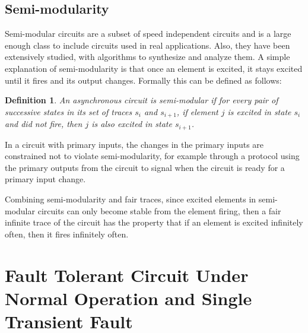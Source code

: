 \documentclass[12pt]{report}
\newtheorem*{definition}{Definition}
\begin{document}
\section{Semi-modularity}
Semi-modular circuits are a subset of speed independent circuits and is a large enough class to include circuits used in real applications.  Also, they have been extensively studied, with algorithms to synthesize and analyze them.  A simple explanation of semi-modularity is that once an element is excited, it stays excited until it fires and its output changes.  Formally this can be defined as follows: %
\begin{definition}
An asynchronous circuit is {\em semi-modular} if for every pair of successive states in its set of traces $s_{i}$ and $s_{i+1}$, if element $j$ is excited in state $s_i$ and did not fire, then $j$ is also excited in state $s_{i+1}$. 
\end{definition}
In a circuit with primary inputs, the changes in the primary inputs are constrained not to violate semi-modularity, for example through a protocol using the primary outputs from the circuit to signal when the circuit is ready for a primary input change.

Combining semi-modularity and fair traces, since excited elements in semi-modular circuits can only become stable from the element firing, then a fair infinite trace of the circuit has the property that if an element is excited infinitely often, then it fires infinitely often.  

\chapter{Fault Tolerant Circuit Under Normal Operation and Single Transient Fault}
\end{document}
